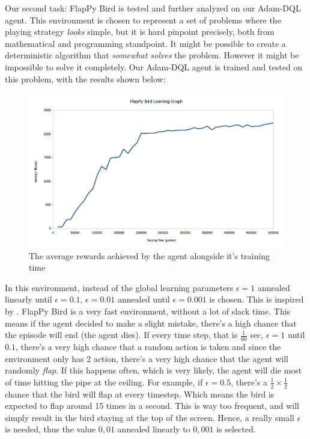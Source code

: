     Our second task: FlapPy Bird is tested and further analyzed on our Adam-DQL agent. This environment is chosen to represent a set of problems where the playing strategy \textit{looks} simple, but it is hard pinpoint precisely, both from mathematical and programming standpoint. It might be possible to create a deterministic algorithm that \textit{somewhat solves} the problem. However it might be impossible to solve it completely. Our Adam-DQL agent is trained and tested on this problem, with the results shown below:
           \begin{figure}[H]
        \centering
        \includegraphics[scale=0.5]{images/flappyreward.png}
        \caption{The average rewards achieved by the agent alongside it's training time}
        \label{fig:flappy1}
    \end{figure}
    In this environment, instead of the global learning parameters $\epsilon=1$ annealed linearly until $\epsilon=0.1$, $\epsilon=0.01$ annealed until $\epsilon=0.001$ is chosen. This is inspired by \cite{flappyDL}. FlapPy Bird is a very fast environment, without a lot of slack time. This means if the agent decided to make a slight mistake, there's a high chance that the episode will end (the agent dies). If every time step, that is $\frac{1}{60}$ sec, $\epsilon=1$ until $0.1$, there's a very high chance that a random action is taken and since the environment only has 2 action, there's a very high chance that the agent will randomly \textit{flap}. If this happens often, which is very likely, the agent will die most of time hitting the pipe at the ceiling. For example, if $\epsilon=0.5$, there's a $\frac{1}{2} \times \frac{1}{2}$ chance that the bird will flap at every timestep. Which means the bird is expected to flap around 15 times in a second. This is way too frequent, and will simply result in the bird staying at the top of the screen. Hence, a really small $\epsilon$ is needed, thus the value $0,01$ annealed linearly to $0,001$ is selected.
